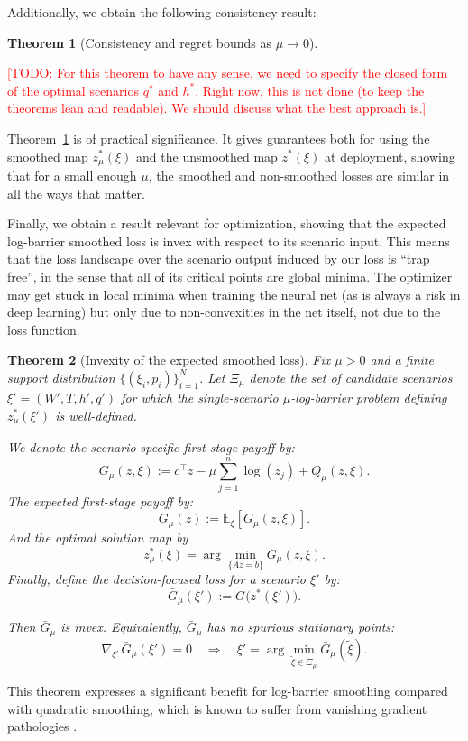 \documentclass{article}
\newcommand{\E}{\mathbb{E}}
\theoremstyle{plain}
\newtheorem{theorem}{Theorem}
\theoremstyle{definition}
\theoremstyle{remark}
\begin{document}
Additionally, we obtain the following consistency result:
\begin{theorem}[Consistency and regret bounds as $\mu\to 0$]
\label{thm:consistency}
\end{theorem}

\textcolor{red}{[TODO: For this theorem to have any sense, we need to specify the closed form of the optimal scenarios $q^*$ and $h^*$. Right now, this is not done (to keep the theorems lean and readable). We should discuss what the best approach is.]}

Theorem~\ref{thm:consistency} is of practical significance. It gives guarantees both for using the smoothed map $z_\mu^*(\xi)$ and the unsmoothed map $z^*(\xi)$ at deployment, showing that for a small enough $\mu$, the smoothed and non-smoothed losses are similar in all the ways that matter.

Finally, we obtain a result relevant for optimization, showing that the expected log-barrier smoothed loss is invex with respect to its scenario input. This means that the loss landscape over the scenario output induced by our loss is ``trap free'', in the sense that all of its critical points are global minima. The optimizer may get stuck in local minima when training the neural net (as is always a risk in deep learning) but only due to non-convexities in the net itself, not due to the loss function.
\begin{theorem}[Invexity of the expected smoothed loss]
\label{thm:invex}
Fix $\mu>0$ and a finite support distribution $\{(\xi_i,p_i)\}_{i=1}^N$.
Let $\Xi_\mu$ denote the set of candidate scenarios $\xi'=(W',T,h',q')$ for which the
single-scenario $\mu$-log-barrier problem defining $z_\mu^*(\xi')$ is well-defined.

We denote the scenario-specific first-stage payoff by:
\[
G_\mu(z,\xi):=c^\top z-\mu\sum_{j=1}^{n}\log(z_j)+Q_\mu(z,\xi).
\]
The expected first-stage payoff by:
\[
G_\mu(z):=\E_{\xi}\!\left[G_\mu(z,\xi)\right].
\]
And the optimal solution map by
\[
z_\mu^*(\xi)=\arg\min_{\{Az=b\}}G_\mu(z,\xi).
\]
Finally, define the decision-focused loss for a scenario $\xi'$ by:
\[
\bar G_\mu(\xi'):=G\!\big(z^*(\xi')\big).
\]

Then $\bar G_\mu$ is invex. Equivalently, $\bar G_\mu$ has no spurious stationary points:
\[
\nabla_{\xi'}\,\bar G_\mu(\xi')=0
\quad\Longrightarrow\quad
\xi'=\arg\min_{\tilde\xi\in\Xi_\mu}\bar G_\mu(\tilde\xi).
\]
\end{theorem}

This theorem expresses a significant benefit for log-barrier smoothing compared with quadratic smoothing, which is known to suffer from vanishing gradient pathologies \cite{quad-vanish-1}.
\end{document}
